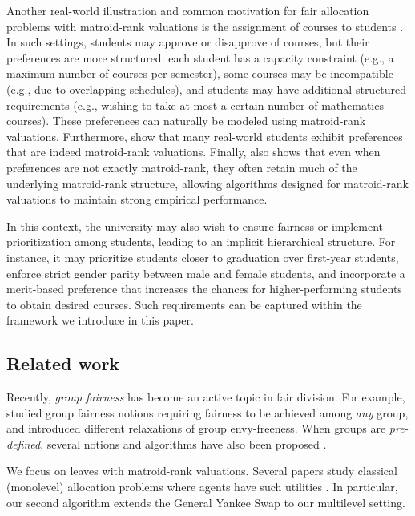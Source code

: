 \documentclass[]{article}
\begin{document}
Another real-world illustration and common motivation for fair allocation problems with matroid-rank valuations is the assignment of courses to students \cite{Benabbou_et_al2021, Viswanathan_Zick2023a}. In such settings, students may approve or disapprove of courses, but their preferences are more structured: each student has a capacity constraint (e.g., a maximum number of courses per semester), some courses may be incompatible (e.g., due to overlapping schedules), and students may have additional structured requirements (e.g., wishing to take at most a certain number of mathematics courses). These preferences can naturally be modeled using matroid-rank valuations. Furthermore, \cite{Bissias_et_al2025} show that many real-world students exhibit preferences that are indeed matroid-rank valuations. Finally, \cite{Bissias_et_al2025} also shows that even when preferences are not exactly matroid-rank, they often retain much of the underlying matroid-rank structure, allowing algorithms designed for matroid-rank valuations to maintain strong empirical performance. 

In this context, the university may also wish to ensure fairness or implement prioritization among students, leading to an implicit hierarchical structure. For instance, it may prioritize students closer to graduation over first-year students, enforce strict gender parity between male and female students, and incorporate a merit-based preference that increases the chances for higher-performing students to obtain desired courses. Such requirements can be captured within the framework we introduce in this paper.

\subsection{Related work}
Recently, \emph{group fairness} has become an active topic in fair division. For example, \cite{Aziz_Rey_2019,Conitzer_et_al2019} studied group fairness notions requiring fairness to be achieved among \emph{any} group, and introduced different relaxations of group envy-freeness. When groups are \emph{pre-defined}, several notions and algorithms have also been proposed \cite{Benabbou_et_al_2019, Chakraborty_et_al_2020,Kyropoulou_2019, Aleksandrov_Walsh_2018, GrossHumbert_et_al2023}. 

We focus on leaves with matroid-rank valuations. Several papers study classical (monolevel) allocation problems where agents have such utilities \cite{Benabbou_et_al2021, Babaioff_et_al2021, Viswanathan_Zick2023a}. In particular, our second algorithm extends the General Yankee Swap \cite{Viswanathan_Zick2023b} to our multilevel setting.
\end{document}
